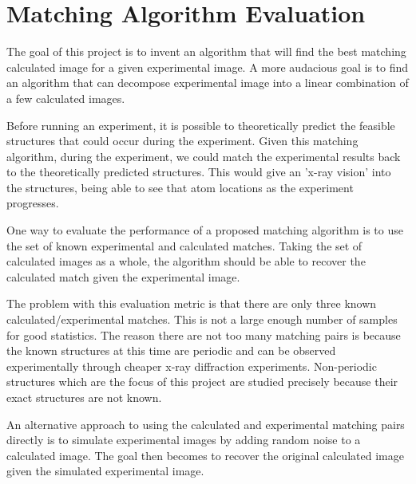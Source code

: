 \documentclass[12pt,letterpaper]{article}
\begin{document}
\clearpage

\section{Matching Algorithm Evaluation \label{s:algo_eval}}

The goal of this project is to invent an algorithm that will find the best
matching calculated image for a given experimental image. A more audacious goal
is to find an algorithm that can decompose experimental image into a linear
combination of a few calculated images.

Before running an experiment, it is possible to theoretically predict the
feasible structures that could occur during the experiment. Given this matching
algorithm, during the experiment, we could match the experimental results back
to the theoretically predicted structures. This would give an 'x-ray vision' into
the structures, being able to see that atom locations as the experiment
progresses.

One way to evaluate the performance of a proposed matching algorithm is to use
the set of known experimental and calculated matches. Taking the set of
calculated images as a whole, the algorithm should be able to recover the
calculated match given the experimental image. 

The problem with this evaluation metric is that there are only three known
calculated/experimental matches. This is not a large enough number of samples
for good statistics. The reason there are not too many matching pairs is because
the known structures at this time are periodic and can be observed
experimentally through cheaper x-ray diffraction experiments. Non-periodic
structures which are the focus of this project are studied precisely because
their exact structures are not known.

An alternative approach to using the calculated and experimental matching pairs
directly is to simulate experimental images by adding random noise to a
calculated image. The goal then becomes to recover the original calculated image
given the simulated experimental image.
\end{document}
